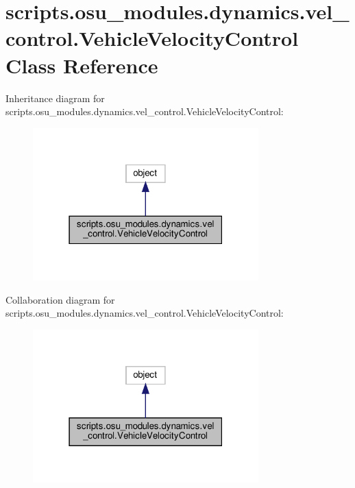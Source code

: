 \hypertarget{classscripts_1_1osu__modules_1_1dynamics_1_1vel__control_1_1VehicleVelocityControl}{}\section{scripts.\+osu\+\_\+modules.\+dynamics.\+vel\+\_\+control.\+Vehicle\+Velocity\+Control Class Reference}
\label{classscripts_1_1osu__modules_1_1dynamics_1_1vel__control_1_1VehicleVelocityControl}


Inheritance diagram for scripts.\+osu\+\_\+modules.\+dynamics.\+vel\+\_\+control.\+Vehicle\+Velocity\+Control\+:\nopagebreak
\begin{figure}[H]
\begin{center}
\leavevmode
\includegraphics[width=247pt]{d1/d10/classscripts_1_1osu__modules_1_1dynamics_1_1vel__control_1_1VehicleVelocityControl__inherit__graph}
\end{center}
\end{figure}


Collaboration diagram for scripts.\+osu\+\_\+modules.\+dynamics.\+vel\+\_\+control.\+Vehicle\+Velocity\+Control\+:\nopagebreak
\begin{figure}[H]
\begin{center}
\leavevmode
\includegraphics[width=247pt]{df/de5/classscripts_1_1osu__modules_1_1dynamics_1_1vel__control_1_1VehicleVelocityControl__coll__graph}
\end{center}
\end{figure}
